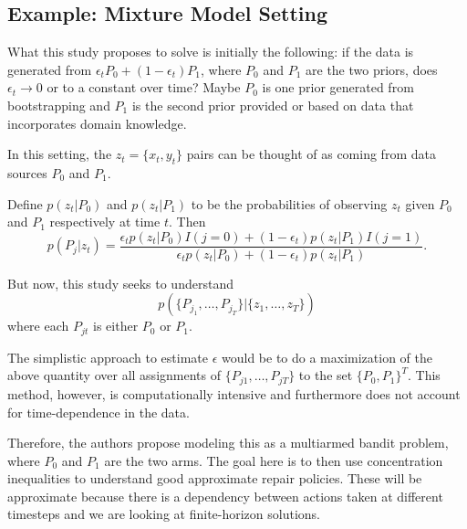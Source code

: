 \documentclass[english]{article}
\numberwithin{equation}{section}
\begin{document}
	\subsection*{Example: Mixture Model Setting}
	What this study proposes to solve is initially the following:
	if the data is generated from $\epsilon_t P_0 + (1-\epsilon_t) P_1$, where $P_0$ and $P_1$ are the two priors, does $\epsilon_t\to 0$ or to a constant over time? Maybe $P_0$ is one prior generated from bootstrapping and $P_1$ is the second prior provided or based on data that incorporates domain knowledge.
	
	In this setting, the $z_t=\{x_t,y_t\}$ pairs can be thought of as coming from data sources $P_0$ and $P_1$.
	
	Define $p(z_t|P_0)$ and $p(z_t|P_1)$ to be the probabilities of observing $z_t$ given $P_0$ and $P_1$ respectively at time $t$. Then $$p(P_j|z_t)=\frac{\epsilon_t p(z_t|P_0) I(j=0) + (1-\epsilon_t) p(z_t|P_1) I(j=1)}{\epsilon_t p(z_t|P_0) + (1-\epsilon_t) p(z_t|P_1)}.$$
	
	But now, this study seeks to understand
	$$p(\{P_{j_1},\ldots,P_{j_T}\}|\{z_1,\ldots,z_T\})$$ where each $P_{jt}$ is either $P_0$ or $P_1$.
	
	The simplistic approach to estimate $\epsilon$ would be to do a maximization of the above quantity over all assignments of $\{P_{j1},\ldots,P_{jT}\}$ to the set $\{P_0,P_1\}^T$. This method, however, is computationally intensive and furthermore does not account for time-dependence in the data.
	
	Therefore, the authors propose modeling this as a multiarmed bandit problem, where $P_0$ and $P_1$ are the two arms. The goal here is to then use concentration inequalities to understand good approximate repair policies. These will be approximate because there is a dependency between actions taken at different timesteps and we are looking at finite-horizon solutions.
	
\end{document}
